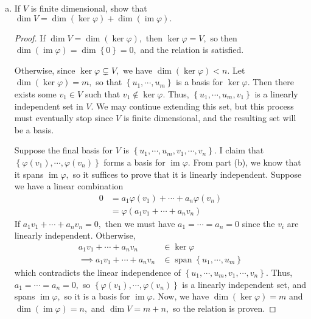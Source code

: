 \documentclass{article}
\DeclareMathOperator{\ima}{im}
\DeclareMathOperator{\spn}{span}
\begin{document}
\begin{itemize}
\begin{enumerate}[(a)]
			\item If $V$ is finite dimensional, show that $\dim V=\dim(\ker \varphi)+\dim(\ima \varphi).$ 
				\begin{proof}
					If $\dim V=\dim(\ker \varphi),$ then $\ker \varphi=V,$ so then $\dim(\ima \varphi)=\dim \left\{ 0 \right\} = 0,$ and the relation is satisfied.

					Otherwise, since $\ker\varphi\subsetneq V,$ we have $\dim(\ker \varphi)<n.$ Let $\dim (\ker \varphi)=m,$ so that $\left\{ u_1, \cdots, u_m \right\}$ is a basis for $\ker \varphi.$ Then there exists some $v_1\in V$ such that $v_1\notin \ker\varphi.$ Thus, $\left\{ u_1, \cdots, u_m, v_1 \right\}$ is a linearly independent set in $V.$ We may continue extending this set, but this process must eventually stop since $V$ is finite dimensional, and the resulting set will be a basis. 
					
					Suppose the final basis for $V$ is $\left\{ u_1, \cdots, u_m, v_1, \cdots, v_n \right\}.$ I claim that $\left\{ \varphi(v_1), \cdots, \varphi(v_n) \right\}$ forms a basis for $\ima \varphi.$ From part (b), we know that it spans $\ima \varphi,$ so it suffices to prove that it is linearly independent. Suppose we have a linear combination
					\begin{align*}
						0&= a_1\varphi(v_1)+\cdots+a_n \varphi(v_n) \\
						&= \varphi(a_1v_1+\cdots+a_nv_n)
					\end{align*}
					If $a_1v_1+\cdots+a_nv_n=0,$ then we must have $a_1=\cdots=a_n=0$ since the $v_i$ are linearly independent. Otherwise,
					\begin{align*}
						a_1v_1+\cdots+a_nv_n&\in\ker\varphi \\
						\implies a_1v_1+\cdots+a_nv_n&\in\spn\left\{ u_1, \cdots, u_m \right\}
					\end{align*}
					which contradicts the linear independence of $\left\{ u_1, \cdots, u_m, v_1, \cdots, v_n \right\}.$ Thus, $a_1=\cdots=a_n=0,$ so $\left\{ \varphi(v_1), \cdots, \varphi(v_n) \right\}$ is a linearly independent set, and spans $\ima \varphi,$ so it is a basis for $\ima \varphi.$ Now, we have $\dim(\ker\varphi)=m$ and $\dim(\ima \varphi)=n,$ and $\dim V=m+n,$ so the relation is proven.
				\end{proof}
		\end{enumerate}


\end{itemize}
\end{document}
